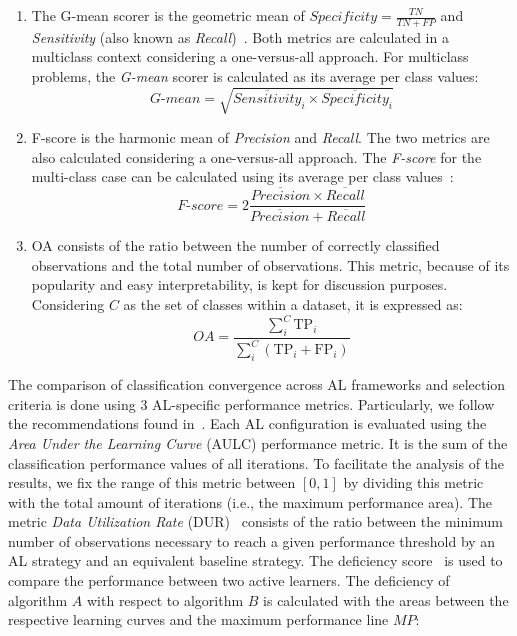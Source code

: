 \documentclass[parskip=full]{scrartcl}
\begin{document}
\begin{enumerate}
    \item The G-mean scorer is the geometric mean of $Specificity = \frac{TN}{TN
        + FP}$ and \textit{Sensitivity} (also known as
        \textit{Recall})~\cite{Kubat1997}. Both metrics are calculated in a
        multiclass context considering a one-versus-all approach. For multiclass
        problems, the \textit{G-mean} scorer is calculated as its average per
        class values: 
        \begin{equation}\label{eq:gmean}
            \textit{G-mean} = \sqrt{\overline{Sensitivity}_i \times
            \overline{Specificity}_i}
        \end{equation}
    
    \item F-score is the harmonic mean of \textit{Precision} and
        \textit{Recall}. The two metrics are also calculated considering a
        one-versus-all approach. The \textit{F-score} for the multi-class case
        can be calculated using its average per class values~\cite{He2009}:
        \begin{equation}\label{eq:fscore}
            \textit{F-score}=2\frac{\overline{Precision} \times
            \overline{Recall}}{\overline{Precision} + \overline{Recall}}
        \end{equation}

    \item OA consists of the ratio between the number of correctly classified
        observations and the total number of observations. This metric, because of its
        popularity and easy interpretability, is kept for discussion purposes.
        Considering $C$ as the set of classes within a dataset, it is expressed as: 
        \begin{equation}\label{eq:oa}
            \textit{OA} =
            \frac{\sum_{i}^{C}{\text{TP}_{i}}}{\sum_{i}^{C}{(\text{TP}_{i} +
            \text{FP}_{i})}}
        \end{equation}

\end{enumerate}

The comparison of classification convergence across AL frameworks and selection
criteria is done using 3 AL-specific performance metrics. Particularly, we
follow the recommendations found in~\cite{Kottke2017}. Each AL configuration is
evaluated using the \textit{Area Under the Learning Curve} (AULC) performance
metric. It is the sum of the classification performance values of all
iterations. To facilitate the analysis of the results, we fix the range of this
metric between $[0,1]$ by dividing this metric with the total amount of
iterations (i.e., the maximum performance area). The metric \textit{Data
Utilization Rate} (DUR)~\cite{Reitmaier2013} consists of the ratio between the
minimum number of observations necessary to reach a given performance threshold
by an AL strategy and an equivalent baseline strategy. The deficiency
score~\cite{Yanik2015} is used to compare the performance between two active
learners. The deficiency of algorithm $A$ with respect to algorithm $B$ is
calculated with the areas between the respective learning curves and the maximum
performance line $MP$:
\end{document}
